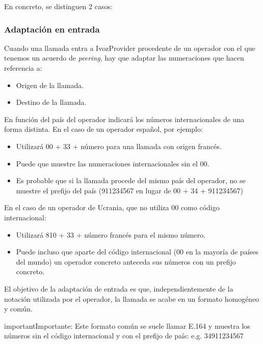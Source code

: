 \documentclass[letterpaper,10pt,spanish]{sphinxmanual}
\begin{document}
En concreto, se distinguen 2 casos:


\subsubsection{Adaptación en entrada}
\label{external_incoming_calls/numeric_transformations:incoming-transformations}
Cuando una llamada entra a IvozProvider procedente de un operador con el que tenemos un acuerdo de \emph{peering}, hay que adaptar las numeraciones que hacen referencia a:
\begin{itemize}
\item {} 
Origen de la llamada.

\item {} 
Destino de la llamada.

\end{itemize}

En función del país del operador indicará los números internacionales de una forma distinta. En el caso de un operador español, por ejemplo:
\begin{itemize}
\item {} 
Utilizará 00 + 33 + número para una llamada con origen francés.

\item {} 
Puede que muestre las numeraciones internacionales sin el 00.

\item {} 
Es probable que si la llamada procede del mismo país del operador, no se muestre el prefijo del país (911234567 en lugar de 00 + 34 + 911234567)

\end{itemize}

En el caso de un operador de Ucrania, que no utiliza 00 como código internacional:
\begin{itemize}
\item {} 
Utilizará 810 + 33 + número francés para el mismo número.

\item {} 
Puede incluso que aparte del código internacional (00 en la mayoría de países del mundo) un operador concreto anteceda sus números con un prefijo concreto.

\end{itemize}

El objetivo de la adaptación de entrada es que, independientemente de la notación utilizada por el operador, la llamada se acabe en un formato homogéneo y común.
\label{external_incoming_calls/numeric_transformations:e164}
\begin{notice}{important}{Importante:}
Este formato común se suele llamar E.164 y muestra los números sin el código internacional y con el prefijo de país: e.g. 34911234567
\end{notice}
\end{document}
